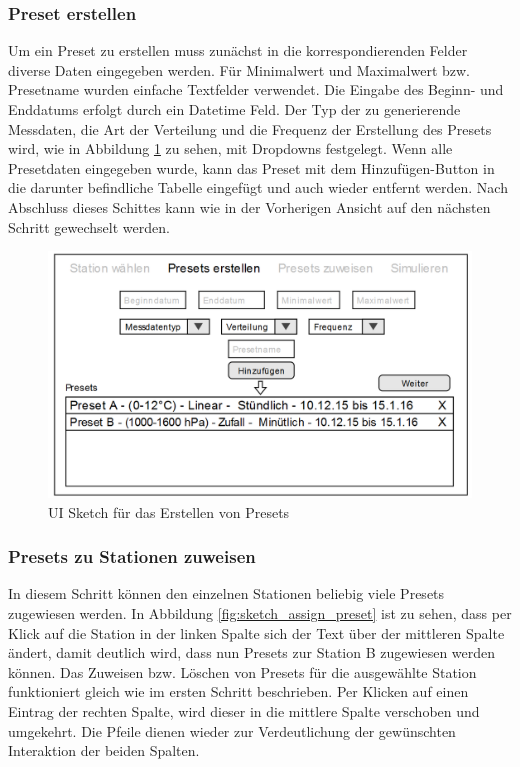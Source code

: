 \subsubsection{Preset erstellen}

Um ein Preset zu erstellen muss zunächst in die korrespondierenden Felder diverse Daten eingegeben werden. Für  Minimalwert und Maximalwert bzw. Presetname wurden einfache Textfelder verwendet. Die Eingabe des Beginn- und Enddatums erfolgt durch ein Datetime Feld. Der Typ der zu generierende Messdaten, die Art der Verteilung und die Frequenz der Erstellung des Presets wird, wie in Abbildung \ref{fig:sketch_add_preset} zu sehen, mit Dropdowns festgelegt. Wenn alle Presetdaten eingegeben wurde, kann das Preset mit dem \grqq Hinzufügen\glqq-Button in die darunter befindliche Tabelle eingefügt und auch wieder entfernt werden. Nach Abschluss dieses Schittes kann wie in der Vorherigen Ansicht auf den nächsten Schritt gewechselt werden.

\begin{figure}[H]
\centering
\includegraphics[width=1\textwidth]{pictures/sketches/simulator/add_presets.png}
\caption{UI Sketch für das Erstellen von Presets}
\label{fig:sketch_add_preset}
\end{figure}
\raggedright

\newpage

\subsubsection{Presets zu Stationen zuweisen}

In diesem Schritt können den einzelnen Stationen beliebig viele Presets zugewiesen werden. In Abbildung \ref{fig:sketch_assign_preset} ist zu sehen, dass per Klick auf die Station in der linken Spalte sich der Text über der mittleren Spalte ändert, damit deutlich wird, dass nun Presets zur Station B zugewiesen werden können. Das Zuweisen bzw. Löschen von Presets für die ausgewählte Station funktioniert gleich wie im ersten Schritt beschrieben. Per Klicken auf einen Eintrag der rechten Spalte, wird dieser in die mittlere Spalte verschoben und umgekehrt. Die Pfeile dienen wieder zur Verdeutlichung der gewünschten Interaktion der beiden Spalten.

